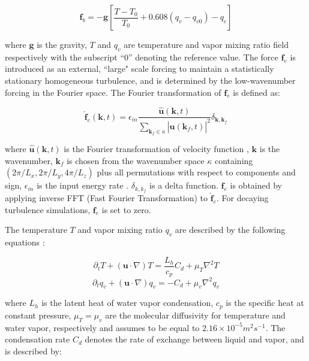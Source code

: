 \documentclass[draft,linenumbers]{agujournal}
\begin{document}
\begin{equation}
\mathbf{f}_b= 
-\mathbf{g}[\frac{T-T_{0}}{T_0}+0.608(q_{v}-q_{v0})-q_{c}]
\label{eq:source_term}
\end{equation}

where $\mathbf{g}$ is the gravity, $T$ and $q_{v}$ are temperature
and vapor mixing ratio field respectively with the subscript ``$0$''
denoting the reference value. The force $\mathbf{f}_e$ is introduced as an external, ``large" scale forcing to maintain a statistically stationary homogeneous turbulence, and is determined by the low-wavenumber forcing in the Fourier space. {\color{green} The Fourier transformation of $\mathbf{f}_e$ is defined as:}

\begin{equation}
\mathbf{\hat{f}}_e(\mathbf{k},t) = \epsilon_{in}\frac{\mathbf{\hat{u}}(\mathbf{k},t)}
{\sum_{\mathbf{k}_f\in \kappa}|\mathbf{\hat{u}}(\mathbf{k}_f,t)|^2}
\delta_{\mathbf{k},\mathbf{k}_f}
\label{eq:fe}
\end{equation}

where {\color{green} $\mathbf{\hat{u}}(\mathbf{k},t)$ is the Fourier transformation of velocity function , $\mathbf{k}$ is the wavenumber, $\mathbf{k}_f$ is chosen from the wavenumber space $\kappa$ containing $(2\pi/L_x,2\pi/L_y,4\pi/L_z)$ plus all permutations with respect to components and sign}, $\epsilon_{in}$ is the input energy rate \citep{ghosal1995dynamic}. $\delta_{k,k_f}$ is a delta function.  {\color{green} $\mathbf{f}_e$ is obtained by applying inverse FFT (Fast Fourier Transformation) to $\mathbf{\hat{f}}_e$.} For decaying turbulence simulations, $\mathbf{f}_e$ is set to zero.

The temperature $T$ and vapor mixing ratio $q_v$ are described by the following equations \citep{Kumar11}:

\begin{equation}
\partial_{t}T+(\mathbf{u}\cdot\nabla)T=\frac{L_{h}}{c_{p}}C_{d}+\mu_{T}\nabla^{2}T\label{eq:Temp}
\end{equation}
\begin{equation}
\partial_{t}q_{v}+(\mathbf{u}\cdot\nabla)q_{v}=-C_{d}+\mu_{v}\nabla^{2}q_{v}\label{eq:Vapor}
\end{equation}

where $L_{h}$ is the latent heat of water vapor condensation,
$c_{p}$ is the specific heat at constant pressure, $\mu_{T}=\mu_{v}$ are
the molecular diffusivity for temperature and water vapor, respectively
and assumes to be equal to $2.16\times 10^{-5}m^2s^{-1}$. The condensation rate $C_{d}$ denotes the rate of exchange between liquid and vapor, and is described by:
\end{document}
